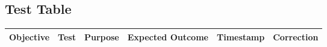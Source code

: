 \subsection{Test Table}

\begin{longtable}{ | p{2cm} | p{2cm} | p{3cm} | p{3cm} | p{2cm} | p{2cm} |  } 
    \hline
        Objective & Test & Purpose & Expected Outcome & Timestamp & Correction \\ 
    \hline
\end{longtable}